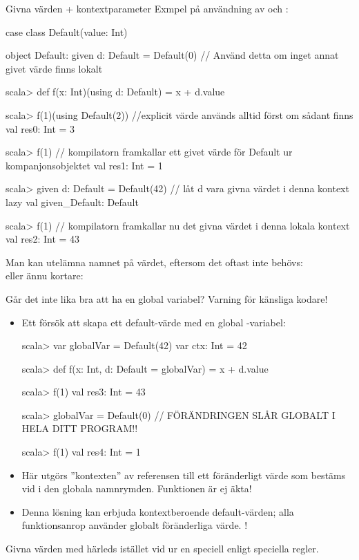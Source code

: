 \begin{Slide}{Givna värden + kontextparameter}\SlideFontSmall
Exmpel på användning av  och :
\begin{CodeSmall}
case class Default(value: Int)

object Default:
  given d: Default = Default(0)  // Använd detta om inget annat givet värde finns lokalt
\end{CodeSmall}
\pause
\begin{REPLsmall}
scala> def f(x: Int)(using d: Default) = x + d.value

scala> f(1)(using Default(2))    //explicit värde används alltid först om sådant finns
val res0: Int = 3

scala> f(1)  // kompilatorn framkallar ett givet värde för Default ur kompanjonsobjektet
val res1: Int = 1

scala> given d: Default = Default(42)  // låt d vara givna värdet i denna kontext
lazy val given_Default: Default

scala> f(1)       // kompilatorn framkallar nu det givna värdet i denna lokala kontext
val res2: Int = 43
\end{REPLsmall}
Man kan utelämna namnet på värdet, eftersom det oftast inte behövs:\\
 eller ännu kortare: 
\end{Slide}

\begin{Slide}{Går det inte lika bra att ha en global variabel?}
  \SlideFontSmall Varning för känsliga kodare!
\begin{itemize}\SlideFontSmall
\item Ett försök att skapa ett default-värde med en global -variabel:
\begin{REPLsmall}
scala> var globalVar = Default(42)
var ctx: Int = 42

scala> def f(x: Int, d: Default = globalVar) = x + d.value

scala> f(1)
val res3: Int = 43

scala> globalVar = Default(0) // FÖRÄNDRINGEN SLÅR GLOBALT I HELA DITT PROGRAM!!

scala> f(1)                                                                      
val res4: Int = 1
\end{REPLsmall} 
\item Här utgörs ''kontexten'' av referensen till ett föränderligt värde som bestäms vid  i den globala namnrymden. Funktionen  är ej äkta! 
\item Denna lösning kan  erbjuda  kontextberoende default-värden; alla funktionsanrop använder  globalt föränderliga värde. !
\end{itemize}
Givna värden med  härleds istället vid  ur en speciell   enligt speciella regler.
\end{Slide}


